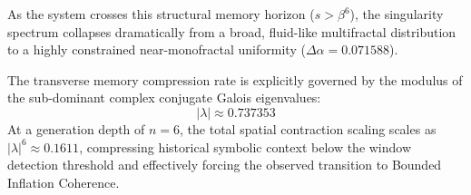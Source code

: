 As the system crosses this structural memory horizon ($s > \beta^6$), the singularity spectrum collapses dramatically from a broad, fluid-like multifractal distribution to a highly constrained near-monofractal uniformity ($\Delta\alpha = 0.071588$). 

The transverse memory compression rate is explicitly governed by the modulus of the sub-dominant complex conjugate Galois eigenvalues:
\[
|\lambda| \approx 0.737353
\]
At a generation depth of $n=6$, the total spatial contraction scaling scales as $|\lambda|^6 \approx 0.1611$, compressing historical symbolic context below the window detection threshold and effectively forcing the observed transition to Bounded Inflation Coherence.
